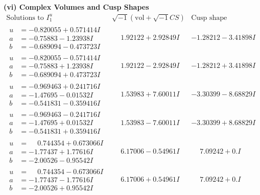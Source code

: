 \documentclass[1p]{elsarticle_modified}
\theoremstyle{definition}
\newcommand{\I}{\sqrt{-1}}
\begin{document}
\newpage\flushleft \textbf{(vi) Complex Volumes and Cusp Shapes}
$$\begin{array}{c|c|c}  
\text{Solutions to }I^u_{1}& \I (\text{vol} + \sqrt{-1}CS) & \text{Cusp shape}\\
 \hline 
\begin{aligned}
u &= -0.820055 + 0.571414 I \\
a &= -0.75883 - 1.23938 I \\
b &= -0.689094 - 0.473723 I\end{aligned}
 & \phantom{-}1.92122 + 2.92849 I & -1.28212 - 3.41898 I \\ \hline\begin{aligned}
u &= -0.820055 - 0.571414 I \\
a &= -0.75883 + 1.23938 I \\
b &= -0.689094 + 0.473723 I\end{aligned}
 & \phantom{-}1.92122 - 2.92849 I & -1.28212 + 3.41898 I \\ \hline\begin{aligned}
u &= -0.969463 + 0.241716 I \\
a &= -1.47695 - 0.01532 I \\
b &= -0.541831 - 0.359416 I\end{aligned}
 & \phantom{-}1.53983 + 7.60011 I & -3.30399 - 8.68829 I \\ \hline\begin{aligned}
u &= -0.969463 - 0.241716 I \\
a &= -1.47695 + 0.01532 I \\
b &= -0.541831 + 0.359416 I\end{aligned}
 & \phantom{-}1.53983 - 7.60011 I & -3.30399 + 8.68829 I \\ \hline\begin{aligned}
u &= \phantom{-}0.744354 + 0.673066 I \\
a &= -1.77437 + 1.77616 I \\
b &= -2.00526 - 0.95542 I\end{aligned}
 & \phantom{-}6.17006 - 0.54961 I & \phantom{-}7.09242 + 0. I\phantom{ +0.000000I} \\ \hline\begin{aligned}
u &= \phantom{-}0.744354 - 0.673066 I \\
a &= -1.77437 - 1.77616 I \\
b &= -2.00526 + 0.95542 I\end{aligned}
 & \phantom{-}6.17006 + 0.54961 I & \phantom{-}7.09242 + 0. I\phantom{ +0.000000I} \\ \hline\begin{aligned}

\end{aligned}
\end{array}$$
\end{document}
